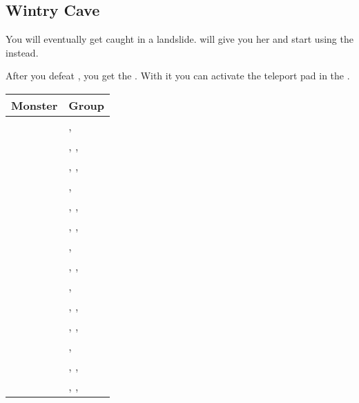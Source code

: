 \subsection{Wintry Cave}
\label{map:wintry_cave}

You will eventually get caught in a landslide.  will give you her  and start using the  instead.

After you defeat , you get the . With it you can activate the teleport pad in the .

\noindent\begin{tabularx}{\textwidth}[l]{lX}
	Monster & Group
\\ \hline
	\nameref{monster:scorpion}
	& \nameref{monster:scorpion}, \nameref{monster:scorpion} \\
	& \nameref{monster:scorpion}, \nameref{monster:scorpion}, \nameref{monster:giant_toad} \\
	& \nameref{monster:scorpion}, \nameref{monster:scorpion}, \nameref{monster:scorpion}
\\ \hline
	\nameref{monster:edgehog}
	& \nameref{monster:edgehog}, \nameref{monster:edgehog} \\
	& \nameref{monster:edgehog}, \nameref{monster:edgehog}, \nameref{monster:scorpion} \\
	& \nameref{monster:edgehog}, \nameref{monster:edgehog}, \nameref{monster:edgehog}
\\ \hline
	\nameref{monster:land_worm}
	& \nameref{monster:land_worm}, \nameref{monster:land_worm} \\
	& \nameref{monster:land_worm}, \nameref{monster:land_worm}, \nameref{monster:edgehog}
\\ \hline
	\nameref{monster:centaur}
	& \nameref{monster:centaur}, \nameref{monster:centaur} \\
	& \nameref{monster:centaur}, \nameref{monster:centaur}, \nameref{monster:land_worm} \\
	& \nameref{monster:centaur}, \nameref{monster:centaur}, \nameref{monster:centaur}
\\ \hline
	\nameref{monster:land_turtle}
	& \nameref{monster:land_turtle}, \nameref{monster:land_turtle} \\
	& \nameref{monster:land_turtle}, \nameref{monster:land_turtle}, \nameref{monster:centaur} \\
	& \nameref{monster:land_turtle}, \nameref{monster:land_turtle}, \nameref{monster:land_turtle}

\end{tabularx}
